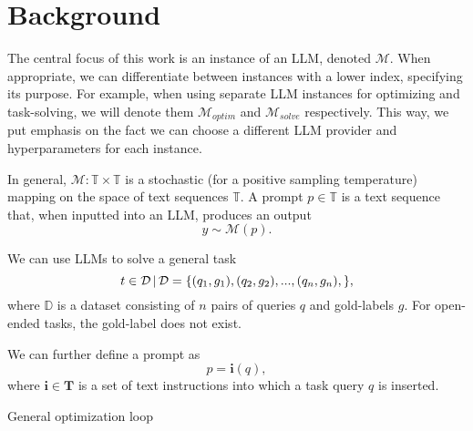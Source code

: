 \section{Background}
The central focus of this work is an instance of an LLM, denoted $\mathcal{M}$. 
When appropriate, we can differentiate between instances with a lower index, specifying its purpose. 
For example, when using separate LLM instances for optimizing and task-solving, we will denote them $\mathcal{M}_{optim}$ and $\mathcal{M}_{solve}$ respectively.
This way, we put emphasis on the fact we can choose a different LLM provider and hyperparameters for each instance.


In general, $\mathcal{M}: \mathbb{T} \times \mathbb{T}$ is a stochastic (for a positive sampling temperature) mapping on the space of text sequences $\mathbb{T}$.
A prompt $p \in \mathbb{T}$ is a text sequence that, when inputted into an LLM, produces an output
\begin{equation}
    y \sim \mathcal{M}(p).
\end{equation} 

We can use LLMs to solve a general task
\begin{equation}
    t \in \mathcal{D} \, \vert \, \mathcal{D} = \{ (q_1, g_1), (q_2, g_2), ... , (q_n, g_n), \},
\end{equation}
where $\mathbb{D}$ is a dataset consisting of $n$ pairs of queries $q$ and gold-labels $g$. 
For open-ended tasks, the gold-label does not exist.


We can further define a prompt as
\begin{equation}
    p = \mathbf{i}(q),
\end{equation}
where $\mathbf{i} \in \mathbf{T}$ is a set of text instructions into which a task query $q$ is inserted. 

\begin{algorithm}
    \caption{General optimization loop}
    \label{alg:genoptimloop}
     
         
    \end{algorithm}
    
